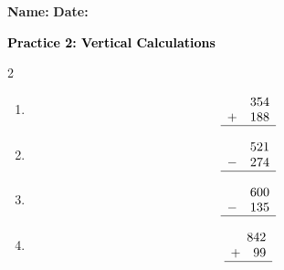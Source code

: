 \documentclass[12pt, letterpaper, fleqn]{article}
\begin{document}
\textbf{Name:} \underline{\hspace{5cm}}
\hfill
\textbf{Date:} \underline{\hspace{3cm}}\\

\begin{tcolorbox}[colback=customteal!20]
    \large\textcolor{black}{\textbf{Practice 2: Vertical Calculations}}
\end{tcolorbox}

\vspace{5mm}
\begin{multicols}{2}
\begin{enumerate}[itemsep=3cm, leftmargin=0.6cm]
\item 
\[
\begin{array}{r}
  354 \\
  +\quad 188 \\
  \hline
\end{array}
\]

\item 
\[
\begin{array}{r}
  521 \\
  -\quad 274 \\
  \hline
\end{array}
\]

\item 
\[
\begin{array}{r}
  600 \\
  -\quad 135 \\
  \hline
\end{array}
\]

\item 
\[
\begin{array}{r}
  842 \\
  +\quad 99 \\
  \hline
\end{array}
\]
\end{enumerate}
\end{multicols}
\end{document}
